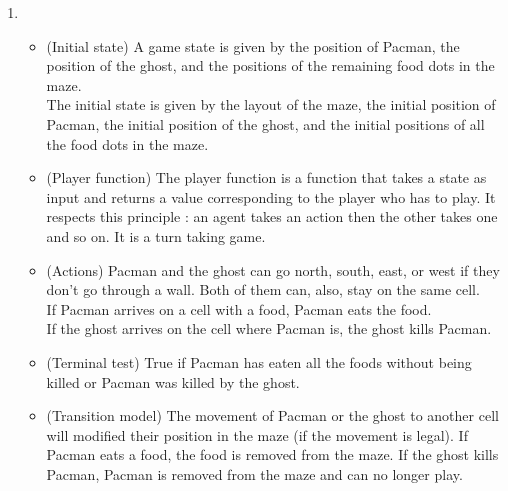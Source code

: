 \documentclass{article}
\begin{document}
\begin{enumerate}[label=\alph*.,leftmargin=*]
    \item
    	\begin{itemize}
    		\item (Initial state) A game state is given by the position of Pacman, the position of the ghost, and the positions of the remaining food dots in the maze.\\
    		The initial state is given by the layout of the maze, the initial position of Pacman, the initial position of the ghost, and the initial positions of all the food dots in the maze.
    		
    		\item (Player function) The player function is a function that takes a state as input and returns a value corresponding to the player who has to play. It respects this principle : an agent takes an action then the other takes one and so on. It is a turn taking game.
    		
    		\item (Actions) Pacman and the ghost can go north, south, east, or west if they don't go through a wall. Both of them can, also, stay on the same cell.\\
    		If Pacman arrives on a cell with a food, Pacman eats the food.\\
    		If the ghost arrives on the cell where Pacman is, the ghost kills Pacman.
    		
    		\item (Terminal test) True if Pacman has eaten all the foods without being killed or Pacman was killed by the ghost.
    		
    		\item (Transition model) The movement of Pacman or the ghost to another cell will modified their position in the maze (if the movement is legal). If Pacman eats a food, the food is removed from the maze. If the ghost kills Pacman, Pacman is removed from the maze and can no longer play.
    		
			

\end{itemize}
\end{enumerate}
\end{document}
